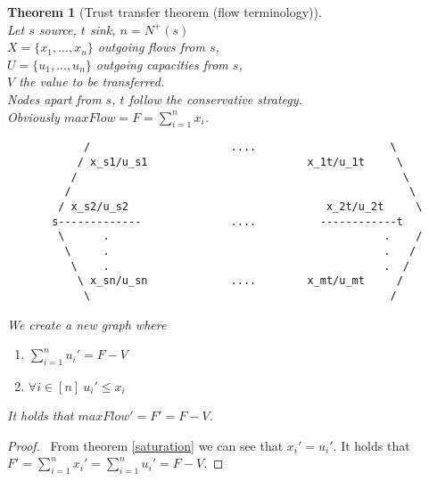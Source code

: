 \documentclass[11pt]{article}
\newtheorem{theorem}{Theorem}[section]
\theoremstyle{definition}
\theoremstyle{corollary}
\newtheorem{corollary}{Corollary}[section]
\theoremstyle{lemma}
\begin{document}
    \begin{theorem}[Trust transfer theorem (flow terminology)] \ \\
       \label{trusttransfer}
       Let $s$ source, $t$ sink, $n = N^{+}(s)$ \\
       $X = \{x_1, ..., x_n\}$ outgoing flows from $s$, \\
       $U = \{u_1, ..., u_n\}$ outgoing capacities from $s$, \\
       $V$ the value to be transferred. \\
       Nodes apart from $s$, $t$ follow the conservative strategy. \\
       Obviously $maxFlow = F = \sum\limits_{i=1}^{n}{x_i}$.
       {\em \begin{lstlisting}
            /                      ....                     \
           / x_s1/u_s1                         x_1t/u_1t     \
          /                                                   \
         /                                                     \
        / x_s2/u_s2                               x_2t/u_2t     \
       s-------------              ....          ------------t
        \      .                                           .    /
         \     .                                           .   /
          \    .                                           .  /
           \ x_sn/u_sn             ....        x_mt/u_mt     /
            \                                               /
       \end{lstlisting}}
       We create a new graph where
       \begin{enumerate}
         \item  $\sum\limits_{i=1}^{n}{u_i'} = F - V$
         \item $\forall i \in [n] \: u_i' \leq x_i$
       \end{enumerate}
 
       It holds that $maxFlow' = F' = F - V$.
    \end{theorem}
    \begin{proof} \
        From theorem \ref{saturation} we can see that $x_i' = u_i'$. It holds that $F' = \sum\limits_{i=1}^nx_i' =
        \sum\limits_{i=1}^nu_i' = F - V$.
    \end{proof}

\end{document}
